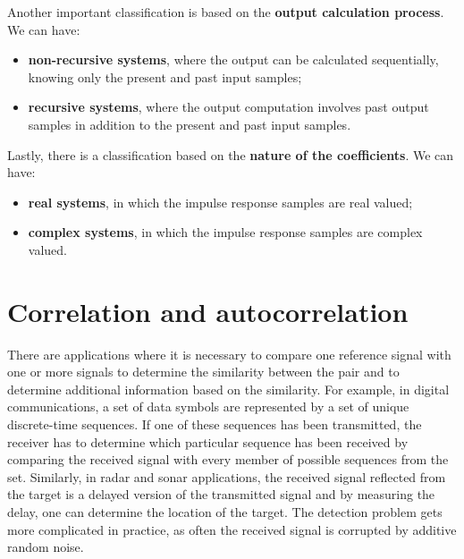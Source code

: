 \documentclass[../../main/main.tex]{subfiles}
\begin{document}
\medskip
{}
Another important classification is based on the \textbf{output calculation process}. We can have:
\begin{itemize}
    \item \textbf{non-recursive systems}, where the output can be calculated sequentially, knowing only the present and past input samples;
    \item \textbf{recursive systems}, where the output computation involves past output samples in addition to the present and past input samples.
\end{itemize}


\medskip
{}
Lastly, there is a classification based on the \textbf{nature of the coefficients}. We can have:
\begin{itemize}
    \item \textbf{real systems}, in which the impulse response samples are real valued;
    \item \textbf{complex systems}, in which the impulse response samples are complex valued.
\end{itemize}





\section{Correlation and autocorrelation}
There are applications where it is necessary to compare one reference signal with one or more signals to determine the similarity between the pair and to determine additional information based on the similarity.
For example, in digital communications, a set of data symbols are represented by a set of unique discrete-time sequences. If one of these sequences has been transmitted, the receiver has to determine which particular sequence has been received by comparing the received signal with every member of possible sequences from the set.
Similarly, in radar and sonar applications, the received signal reflected from the target is a delayed version of the transmitted signal and by measuring the delay, one can determine the location of the target. The detection problem gets more complicated in practice, as often the received signal is corrupted by additive random noise.
\end{document}
